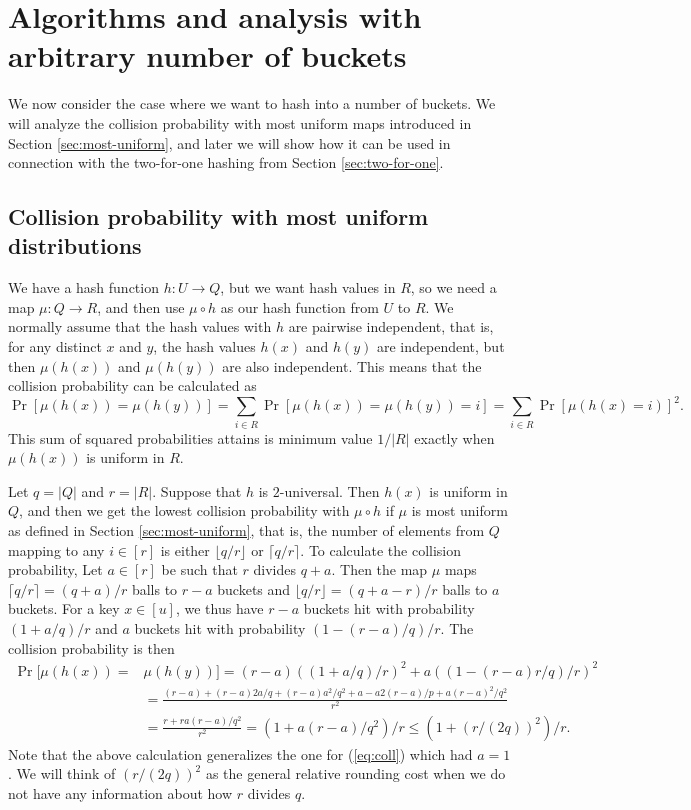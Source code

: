 \documentclass[12pt]{article}
\newcommand{\floor}[1]{\lfloor {#1} \rfloor}
\newcommand{\req}[1]{(\ref{#1})}
\newcommand\fct\rightarrow
\newcommand\ceil[1]{\lceil {#1}\rceil}
\begin{document}
\section{Algorithms and analysis with arbitrary number of buckets}
We now consider the case where we want to hash into
a number of buckets. We will analyze the collision probability
with most uniform maps introduced in Section \ref{sec:most-uniform},
and later we will show how it can be used in connection with the
two-for-one hashing from Section \ref{sec:two-for-one}.

\subsection{Collision probability with most uniform distributions}
We have a hash function $h:U\fct Q$, but we want hash values in $R$, so
we need a map $\mu:Q\fct R$, and then use $\mu\circ h$ as
our hash function from $U$ to $R$. We normally assume that the hash values 
with $h$ are pairwise independent, that is, for any distinct $x$ and $y$,
the hash values $h(x)$ and $h(y)$ are independent, but then 
$\mu(h(x))$ and $\mu(h(y))$ are also independent. This means
that the collision probability can be calculated
as 
\[\Pr[\mu(h(x))=\mu(h(y))]=\sum_{i\in R}\Pr[\mu(h(x))=\mu(h(y))=i]=\sum_{i\in R}\Pr[\mu(h(x)=i)]^2.\]
This sum of squared probabilities attains is minimum value $1/|R|$
exactly when $\mu(h(x))$ is uniform in $R$. 

Let $q=|Q|$ and $r=|R|$. Suppose that $h$ is $2$-universal. Then
$h(x)$ is uniform in $Q$, and then we get the lowest collision
probability with $\mu\circ h$ if $\mu$ is most uniform as defined in
Section \ref{sec:most-uniform}, that is, the number of elements from
$Q$ mapping to any $i\in[r]$ is either $\floor{q/r}$ or
$\ceil{q/r}$. To calculate the collision probability,
Let $a\in[r]$ be such that $r$ divides $q+a$. Then the map $\mu$ maps
$\ceil{q/r}=(q+a)/r$ balls to $r-a$ buckets and
$\floor{q/r}=(q+a-r)/r$ balls to $a$ buckets. For a key $x\in [u]$, we
thus have $r-a$ buckets hit with probability $(1+a/q)/r$ and
$a$ buckets hit with probability $(1-(r-a)/q)/r$.
The collision probability is then
\begin{align}
\Pr[\mu(h(x))=&\mu(h(y))]= (r-a)((1+a/q)/r)^2+a((1-(r-a)r/q)/r)^2\nonumber\\
  &=\frac{(r-a)+(r-a)2a/q+(r-a)a^2/q^2+ a-a2(r-a)/p+a(r-a)^2/q^2}{r^2}\nonumber\\
  &=\frac{r +r a (r-a)/q^2}{r^2}=(1+a(r-a)/q^2)/r\leq \left(1+(r/(2q))^2\right)/r.\label{eq:coll-a}
  \end{align}
Note that the above calculation generalizes the one for \req{eq:coll} which
had $a=1$. We will think of $(r/(2q))^2$ as the general relative rounding
cost when we do not have any information about how $r$ divides $q$.
\end{document}

